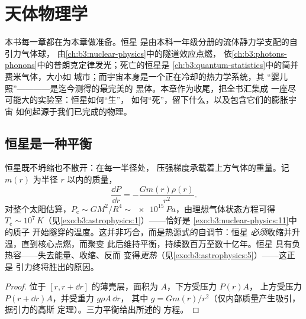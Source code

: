 \chapter{天体物理学}\label{ch:b3:astrophysics}


本书每一章都在为本章做准备。恒星
是由本科一年级分册的流体静力学支配的自引力气体球，
由\cref{ch:b3:nuclear-physics}中的隧道效应点燃，
依\cref{ch:b3:photons-phonons}中的普朗克定律发光；死亡的恒星是
\cref{ch:b3:quantum-statistics}中的简并费米气体，大小如
城市；而宇宙本身是一个正在冷却的热力学系统，其
“婴儿照”————是迄今测得的最完美的
黑体。本章作为收尾，把全书汇集成
一座尽可能大的实验室：恒星如何“生”，
如何“死”，留下什么，以及包含它们的膨胀宇宙
如何起源于我们已完成的物理。

\section{恒星是一种平衡}

\begin{proposition}[流体静力平衡]\label{prop:b3:astrophysics:hydrostatic}
恒星既不坍缩也不散开：在每一半径处，
压强梯度承载着上方气体的重量。记
$m(r)$ 为半径 $r$ 以内的质量，
\[
\frac{\dd P}{\dd r} = -\frac{Gm(r)\rho(r)}{r^2} .
\]
对整个太阳估算，$P_{\text{c}} \sim GM^2/R^4 \sim
\qty{e15}{Pa}$，由理想气体状态方程可得 $T_{\text{c}} \sim
10^7\,\unit{K}$（见\cref{exo:b3:astrophysics:1}）——恰好是
\cref{exo:b3:nuclear-physics:11}中的质子
开始隧穿的温度。这并非巧合，而是热源式的自调节：恒星
\emph{必须}收缩并升温，直到核心点燃，而聚变
此后维持平衡，持续数百万至数十亿年。恒星
具有负热容——失去能量、收缩、反而
变得\emph{更热}（见\cref{exo:b3:astrophysics:5}）——这正是
引力终将胜出的原因。
\end{proposition}

\begin{proof}
位于 $[r, r + \dd r]$ 的薄壳层，面积为 $A$，下方受压力 $P(r)A$，
上方受压力 $P(r + \dd r)A$，并受重力 $g\rho A\,\dd r$，
其中 $g = Gm(r)/r^2$（仅内部质量产生吸引，据引力的高斯
定理）。三力平衡给出所述的
方程。
\end{proof}


